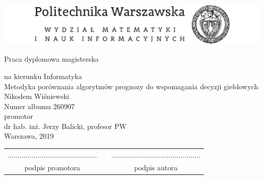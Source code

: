 \documentclass[a4paper, twoside, 11pt, openright]{article}
\newcommand{\myTitle}{Metodyka porównania algorytmów prognozy do wspomagania decyzji giełdowych}
\newcommand{\myName}{Nikodem Wiśniewski}
\newcommand{\myNumber}{260907}
\newcommand{\myThesisType}{Praca dyplomowa magisterska}
\newcommand{\myCourse}{Informatyka}
\newcommand{\myProf}{dr hab. inż. Jerzy Balicki, profesor PW}
\newcommand{\myYear}{2019}
\newcommand{\fncyfront}{%
	\fancyhead[RO]{}
	\fancyfoot[RO]{}
	\fancyhead[LE]{}
	\fancyfoot[LE]{}
	\fancyhead[RE,LO]{}
	\fancyfoot[C]{}
	\renewcommand{\headrulewidth}{0pt}}
\newcommand{\fncymain}{%
	\fancyhead[RO]{{\footnotesize \rightmark}}
	\fancyfoot[RO]{\thepage}
	\fancyhead[LE]{{\footnotesize \leftmark}}
	\fancyfoot[LE]{\thepage}
	\fancyfoot[C]{}
	\renewcommand{\headrulewidth}{0.3pt}}
\begin{document}
\fncyfront
\begin{titlepage}
\begingroup
\begin{center}		
			\includegraphics[width=1.0\textwidth]{img/pw_header}
			
			\vspace{1.0cm}
			\fontsize{24}{30}\selectfont\myThesisType
			\fontsize{12}{14}\selectfont
			
			\vspace{0.5cm}
			na kierunku \myCourse \\
			\vspace{1cm}
			{\fontsize{14}{18}\selectfont \myTitle} \\ 
			
			\vspace{1.5cm}
			\fontsize{21}{25}\selectfont \myName \\
			\fontsize{12}{14}\selectfont
			Numer albumu \myNumber \\

			\vspace{6.5cm}
			promotor \\
			\myProf \\
			\vspace{0.5cm}
			\vfill 
			Warszawa, \myYear
        \vfill                      
\end{center}
\endgroup
\end{titlepage}

\newpage

\hfill
\begin{table}[b]
\centering
\begin{tabular}[t]{ccc}
............................................. & \hspace*{100pt} & .............................................\\
podpis promotora & \hspace*{100pt} & podpis autora
\end{tabular}
\end{table}

\fncymain

\cleardoublepage

\begingroup
\fontsize{12pt}{14.4pt}\selectfont
\end{document}
